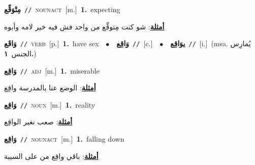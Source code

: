 \documentclass[10pt,a4paper,twoside]{article} %
\begin{document}
\begin{multicols}{2}
{\setlength\topsep{0pt}\textbf{\foreignlanguage{arabic}{مِتْوَقِّع}}\ {\color{gray}\texttt{//}\color{black}}\ \textsc{noun\textunderscore act}\ [m.]\ \textbf{1.}~expecting\  \begin{flushright}\color{gray}\foreignlanguage{arabic}{\textbf{\underline{\foreignlanguage{arabic}{أمثلة}}}: شو كنت مِتوقِّع من واحد فش فيه خير لامه وأبوه}\end{flushright}\color{black}} \vspace{2mm}

{\setlength\topsep{0pt}\textbf{\foreignlanguage{arabic}{وَاقَع}}\ {\color{gray}\texttt{//}\color{black}}\ \textsc{verb}\ [p.]\ \textbf{1.}~have sex\ \ $\bullet$\ \ \setlength\topsep{0pt}\textbf{\foreignlanguage{arabic}{وَاقِع}}\ {\color{gray}\texttt{//}\color{black}}\ [c.]\ \ $\bullet$\ \ \setlength\topsep{0pt}\textbf{\foreignlanguage{arabic}{يوَاقِع}}\ {\color{gray}\texttt{//}\color{black}}\ [i.]\ \color{gray}(msa. \foreignlanguage{arabic}{يُمارِس الجنس}~\foreignlanguage{arabic}{\textbf{١.}})\color{black}\ } \vspace{2mm}

{\setlength\topsep{0pt}\textbf{\foreignlanguage{arabic}{وَاقِع}}\ {\color{gray}\texttt{//}\color{black}}\ \textsc{adj}\ [m.]\ \textbf{1.}~miserable\  \begin{flushright}\color{gray}\foreignlanguage{arabic}{\textbf{\underline{\foreignlanguage{arabic}{أمثلة}}}: الوضع عنا بالمدرسة واقِع}\end{flushright}\color{black}} \vspace{2mm}

{\setlength\topsep{0pt}\textbf{\foreignlanguage{arabic}{وَاقِع}}\ {\color{gray}\texttt{//}\color{black}}\ \textsc{noun}\ [m.]\ \textbf{1.}~reality\  \begin{flushright}\color{gray}\foreignlanguage{arabic}{\textbf{\underline{\foreignlanguage{arabic}{أمثلة}}}: صعب نغير الواقِع}\end{flushright}\color{black}} \vspace{2mm}

{\setlength\topsep{0pt}\textbf{\foreignlanguage{arabic}{وَاقِع}}\ {\color{gray}\texttt{//}\color{black}}\ \textsc{noun\textunderscore act}\ [m.]\ \textbf{1.}~falling down\  \begin{flushright}\color{gray}\foreignlanguage{arabic}{\textbf{\underline{\foreignlanguage{arabic}{أمثلة}}}: باقي واقِع من على السيبة}\end{flushright}\color{black}} \vspace{2mm}


\end{multicols}
\end{document}
